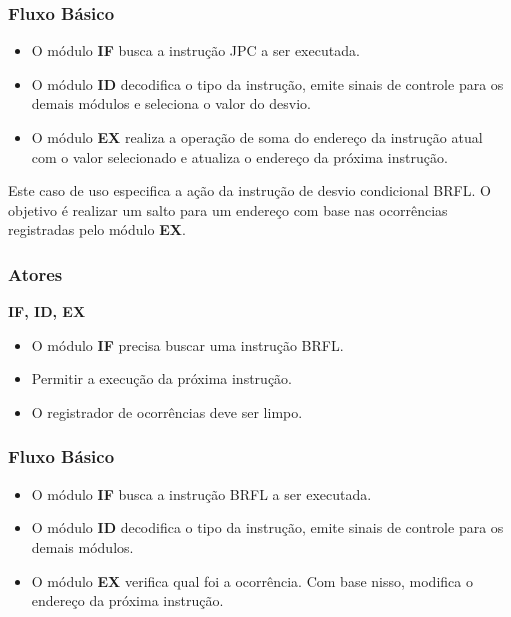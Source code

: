 \subsubsection*{Fluxo Básico}
\begin{itemize}
\item O módulo \textbf{IF} busca a instrução JPC a ser executada.
\item O módulo \textbf{ID} decodifica o tipo da instrução, emite sinais de controle para os demais módulos e seleciona o valor do desvio.
\item O módulo \textbf{EX} realiza a operação de soma do endereço da instrução atual com o valor selecionado e atualiza o endereço da próxima instrução.
\end{itemize}


Este caso de uso especifica a ação da instrução de desvio condicional BRFL. O objetivo é realizar um salto para um endereço com base nas ocorrências registradas pelo módulo \textbf{EX}.
 
\subsubsection*{Atores}
\textbf{IF, ID, EX}

\preconditions 
\begin{itemize}
 \item O módulo \textbf{IF} precisa buscar uma instrução BRFL.
\end{itemize}

\postconditions
\begin{itemize}
  \item Permitir a execução da próxima instrução.
  \item O registrador de ocorrências deve ser limpo.
\end{itemize}

\subsubsection*{Fluxo Básico}
\begin{itemize}
\item O módulo \textbf{IF} busca a instrução BRFL a ser executada.
\item O módulo \textbf{ID} decodifica o tipo da instrução, emite sinais de controle para os demais módulos.
\item O módulo \textbf{EX} verifica qual foi a ocorrência. Com base nisso, modifica o endereço da próxima instrução.
\end{itemize}

